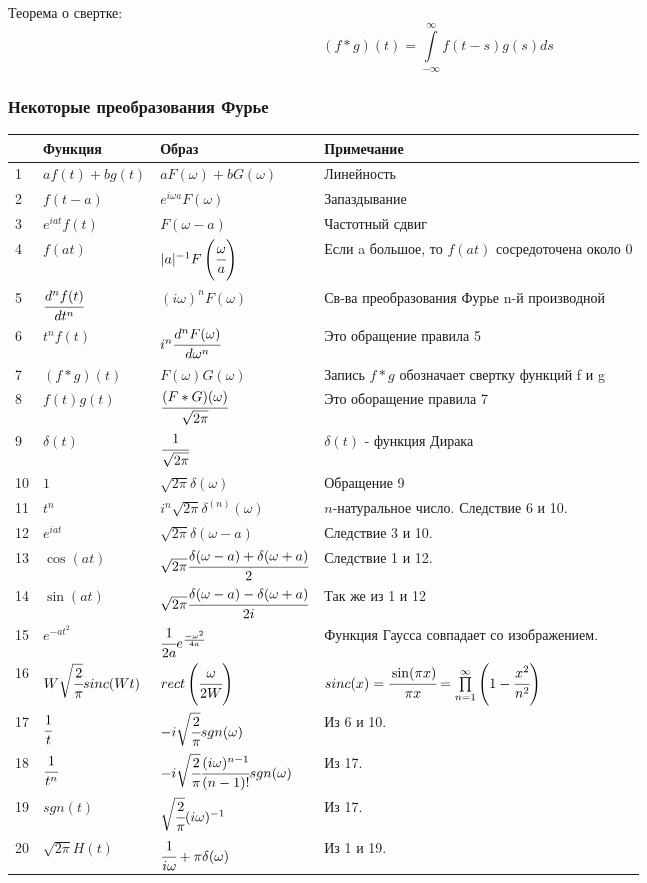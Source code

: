 \documentclass[12pt, a4paper]{article}
\begin{document}
Теорема о свертке:
$$ (f * g)(t) = \int\limits_{-\infty}^{\infty}{ f(t-s)g(s) ds} $$

\subsubsection{Некоторые преобразования Фурье}
\begin{tabular}[c]{|p{0.3cm}|p{2.8cm}|p{4.5cm}|p{8cm}|}
\hline
 &Функция & Образ & Примечание \\ \hline
1 & $ a f(t) + b g(t)$ & $aF(\omega)+bG(\omega)$ & Линейность \\ \hline
2 & $ f(t-a)$ & $e^{i\omega a}F(\omega)$ & Запаздывание \\ \hline
3 & $ e^{iat}f(t)$ & $F(\omega-a)$ & Частотный сдвиг \\ \hline
4 & $ f(at)$ & $ |a|^{-1}F\left( \cfrac{\omega}{a} \right) $ & Если a большое, то $f(at)$ сосредоточена около 0 \\ \hline
5 & $ \cfrac{d^nf(t)}{dt^n} $ & $ (i\omega)^nF(\omega) $ & Св-ва преобразования Фурье n-й производной \\ \hline
6 & $ t^n f(t) $ & $ i^n \cfrac{d^nF(\omega)}{d\omega^n} $ & Это обращение правила 5 \\ \hline
7 & $ (f * g)(t)$ & $ F(\omega)G(\omega) $ & Запись $f*g$ обозначает свертку функций f и g \\ \hline
8 & $ f(t)g(t)$ & $ \cfrac{(F * G)(\omega)}{\sqrt{2\pi}} $ & Это оборащение правила 7 \\ \hline
9 & $ \delta(t) $ & $ \cfrac{1}{\sqrt{2\pi}} $ & $ \delta(t) $ - функция Дирака \\ \hline
10 & $ 1 $ & $ \sqrt{2\pi}\delta(\omega) $ & Обращение 9 \\ \hline
11 & $ t^n $ & $ i^n \sqrt{2\pi} \delta^{(n)}(\omega) $ & $n$-натуральное число. Следствие 6 и 10. \\ \hline
12 & $ e^{iat} $ & $ \sqrt{2\pi}\delta(\omega-a) $  & Следствие 3 и 10.\\ \hline
13 & $ \cos(at) $ & $ \sqrt{2\pi} \cfrac{\delta(\omega-a)+\delta(\omega+a)}{2} $ & Следствие 1 и 12.\\ \hline
14 & $ \sin(at) $ & $ \sqrt{2\pi} \cfrac{\delta(\omega-a)-\delta(\omega+a)}{2i} $ & Так же из 1 и 12\\ \hline
15 & $ e^{-at^2} $ & $ \cfrac{1}{2a} e^{\frac{-\omega^2}{4a}} $ & Функция Гаусса совпадает со  изображением.\\ \hline
16 & $ W\sqrt{\cfrac{2}{\pi}}sinc(Wt) $ & $ rect\left( \cfrac{\omega}{2W} \right) $ & $ sinc(x) = \cfrac{\sin(\pi x)}{\pi x} = \prod\limits^{\infty}_{n=1}{ \left( 1 - \cfrac{x^2}{n^2} \right) }$\\ \hline
17 & $ \cfrac{1}{t} $ & $ -i \sqrt{\cfrac{2}{\pi}} sgn(\omega) $ & Из 6 и 10.\\ \hline
18 & $ \cfrac{1}{t^n} $ & $ -i\sqrt{\cfrac{2}{\pi}} \cfrac{(i\omega)^{n-1}}{(n-1)!} sgn(\omega) $ &  Из 17.\\ \hline
19 & $ sgn(t) $ & $ \sqrt{\cfrac{2}{\pi}}(i\omega)^{-1} $ & Из 17.\\ \hline
20 & $ \sqrt{2\pi}H(t) $ & $ \cfrac{1}{i\omega}+\pi \delta(\omega) $ & Из 1 и 19.\\ 
\hline
\end{tabular}
\end{document}
